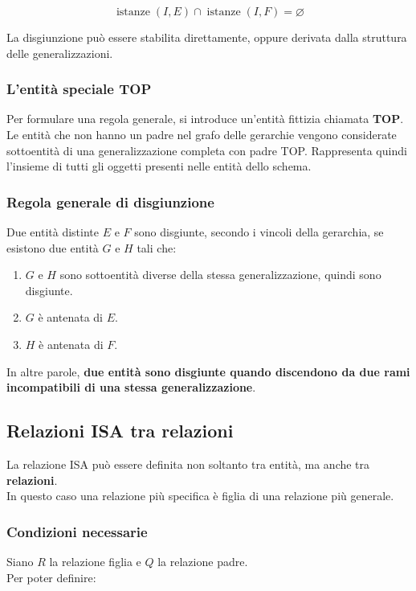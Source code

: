 \[
\operatorname{istanze}(I,E)
\cap
\operatorname{istanze}(I,F)
=
\varnothing
\]

\noindent
La disgiunzione può essere stabilita direttamente, oppure derivata dalla struttura delle generalizzazioni.

\subsubsection*{L'entità speciale TOP}

Per formulare una regola generale, si introduce un'entità fittizia chiamata \textbf{TOP}.\\
Le entità che non hanno un padre nel grafo delle gerarchie vengono considerate sottoentità di una generalizzazione completa con padre TOP.
Rappresenta quindi l'insieme di tutti gli oggetti presenti nelle entità dello schema.

\subsubsection*{Regola generale di disgiunzione}

Due entità distinte $E$ e $F$ sono disgiunte, secondo i vincoli della gerarchia, se esistono due entità $G$ e $H$ tali che:

\begin{enumerate}
    \item $G$ e $H$ sono sottoentità diverse della stessa generalizzazione, quindi sono disgiunte.
    \item $G$ è antenata di $E$.
    \item $H$ è antenata di $F$.
\end{enumerate}
\noindent
In altre parole, \textbf{due entità sono disgiunte quando discendono da due rami incompatibili di una stessa generalizzazione}.


\subsection{Relazioni ISA tra relazioni}

La relazione ISA può essere definita non soltanto tra entità, ma anche tra \textbf{relazioni}.\\
In questo caso una relazione più specifica è figlia di una relazione più generale.
\subsubsection*{Condizioni necessarie}
Siano $R$ la relazione figlia e $Q$ la relazione padre.\\
Per poter definire:

